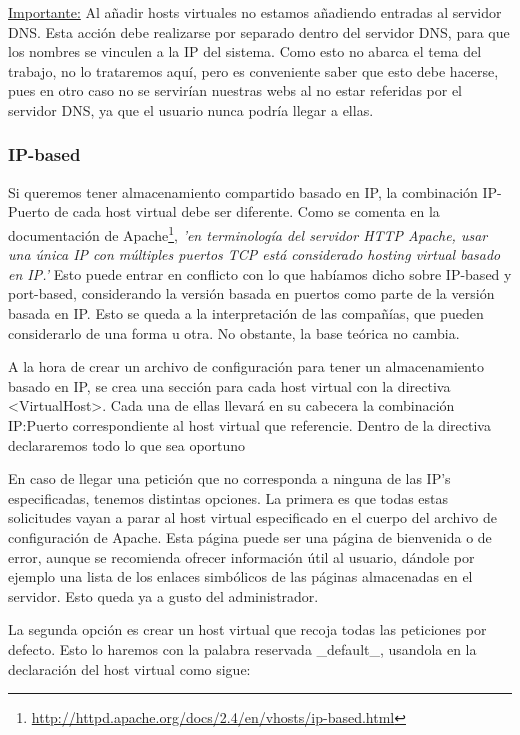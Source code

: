 \documentclass[a4paper, 10pt]{article} %
\begin{document}
\underline{Importante:} Al añadir hosts virtuales no estamos añadiendo entradas al servidor DNS. Esta acción debe realizarse por separado dentro del servidor DNS, para que los nombres se vinculen a la IP del sistema. Como esto no abarca el tema del trabajo, no lo trataremos aquí, pero es conveniente saber que esto debe hacerse, pues en otro caso no se servirían nuestras webs al no estar referidas por el servidor DNS, ya que el usuario nunca podría llegar a ellas. 

\subsubsection{IP-based}

Si queremos tener almacenamiento compartido basado en IP, la combinación IP-Puerto de cada host virtual debe ser diferente. Como se comenta en la documentación de Apache\footnote{\url{http://httpd.apache.org/docs/2.4/en/vhosts/ip-based.html}}, \textit{'en terminología del servidor HTTP Apache, usar una única IP con múltiples puertos TCP está considerado hosting virtual basado en IP.'} Esto puede entrar en conflicto con lo que habíamos dicho sobre IP-based y port-based, considerando la versión basada en puertos como parte de la versión basada en IP. Esto se queda a la interpretación de las compañías, que pueden considerarlo de una forma u otra. No obstante, la base teórica no cambia. 

A la hora de crear un archivo de configuración para tener un almacenamiento basado en IP, se crea una sección para cada host virtual con la directiva <VirtualHost>. Cada una de ellas llevará en su cabecera la combinación IP:Puerto correspondiente al host virtual que referencie. Dentro de la directiva declararemos todo lo que sea oportuno


En caso de llegar una petición que no corresponda a ninguna de las IP's especificadas, tenemos distintas opciones. La primera es que todas estas solicitudes vayan a parar al host virtual especificado en el cuerpo del archivo de configuración de Apache. Esta página puede ser una página de bienvenida o de error, aunque se recomienda ofrecer información útil al usuario, dándole por ejemplo una lista de los enlaces simbólicos de las páginas almacenadas en el servidor. Esto queda ya a gusto del administrador. 

La segunda opción es crear un host virtual que recoja todas las peticiones por defecto. Esto lo haremos con la palabra reservada \_default\_, usandola en la declaración del host virtual como sigue: 
\end{document}
